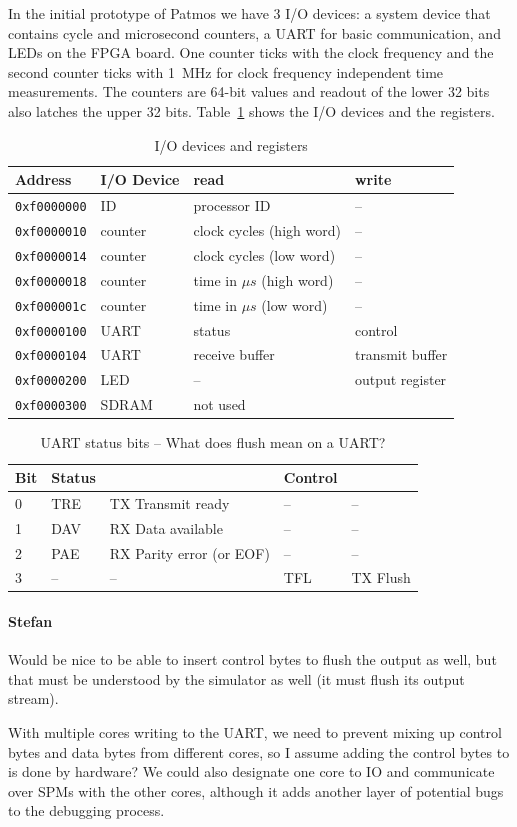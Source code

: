 \documentclass{IEEEtran}
\newcommand{\code}[1]{{\texttt{#1}}}
\newcommand{\comment}[3]{\paragraph*{\textbf{#1}}{\color{#3}#2}}
\newcommand{\stefan}[1]{\comment{Stefan}{#1}{RoyalPurple}}
\begin{document}
In the initial prototype of Patmos we have 3 I/O devices: a system device that contains cycle and microsecond counters, a UART for basic communication, and LEDs
on the FPGA board. One counter ticks with the clock frequency and the second
counter ticks with 1~MHz for clock frequency independent time measurements.
The counters are 64-bit values and readout of the lower 32 bits also latches the
upper 32 bits.
Table~\ref{tab:iomap} shows the I/O devices and the registers.


\begin{table}
\centering
\begin{tabular}{llll}
\toprule
Address & I/O Device & read & write \\
\midrule
\code{0xf0000000} & ID & processor ID & -- \\
\code{0xf0000010} & counter & clock cycles (high word) & -- \\
\code{0xf0000014} & counter & clock cycles (low word) & -- \\
\code{0xf0000018} & counter & time in $\mu s$ (high word) & -- \\
\code{0xf000001c} & counter & time in $\mu s$ (low word) & -- \\
\code{0xf0000100} & UART & status & control \\
\code{0xf0000104} & UART & receive buffer & transmit buffer \\
\code{0xf0000200} & LED & -- & output register \\
\code{0xf0000300} & SDRAM &  not used \\
\bottomrule
\end{tabular}
\caption{I/O devices and registers}
\label{tab:iomap}
\end{table}

\begin{table}
\centering
\begin{tabular}{lllll}
\toprule
Bit & Status & & Control & \\
\midrule
0 & TRE & TX Transmit ready & -- & -- \\
1 & DAV & RX Data available & -- & -- \\
2 & PAE & RX Parity error (or EOF) & -- & -- \\
3 & --  & -- & TFL & TX Flush \\
\bottomrule
\end{tabular}
\caption{UART status bits {-- What does flush mean on a UART?}}
\label{tab:mmap}
\end{table}

\stefan{Would be nice to be able to insert control bytes to flush the output as well, but that must be understood by the simulator as well (it
must flush its output stream). 

With multiple cores writing to the UART, we need to prevent mixing up control bytes and data bytes from different cores, so I assume adding 
the control bytes to is done by hardware? We could also designate one core to IO and communicate over SPMs with the other cores, although it
adds another layer of potential bugs to the debugging process.}
\end{document}
